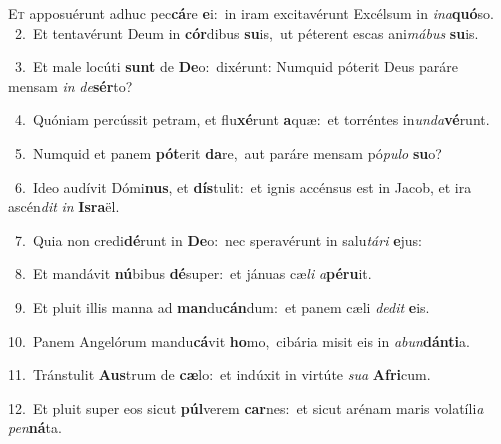 \lettrine{\initial\textcolor{\initialcolor}{E}}{t} apposuérunt adhuc pec\-\textbf{cá}\-re \textbf{e}\-i:~\star in iram excitavérunt Excélsum in \textit{in}\-\textit{a}\textbf{quó}so.\\
{\numbfont\textcolor{\numbcolor}{~2.}}~Et tentavérunt Deum in \textbf{cór}\-dibus \textbf{su}\-is,~\star ut péterent escas ani\-\textit{má}\-\textit{bus} \textbf{su}\-is.\par
{\numbfont\textcolor{\numbcolor}{~3.}}~Et male locúti \textbf{sunt} de \textbf{De}\-o:~\star dixérunt: Numquid póterit Deus paráre mensam \textit{in} \textit{de}\-\textbf{sér}to?\par
{\numbfont\textcolor{\numbcolor}{~4.}}~Quóniam percússit petram, et flu\-\textbf{xé}\-runt \textbf{a}\-quæ:~\star et torréntes in\-\textit{un}\-\textit{da}\textbf{vé}runt.\par
{\numbfont\textcolor{\numbcolor}{~5.}}~Numquid et panem \textbf{pót}\-erit \textbf{da}\-re,~\star aut paráre mensam pó\-\textit{pu}\-\textit{lo} \textbf{su}\-o?\par
{\numbfont\textcolor{\numbcolor}{~6.}}~Ideo audívit Dómi\-\textbf{nus}\-, et \textbf{dís}\-tulit:~\star et ignis accénsus est in Jacob, et ira ascén\textit{dit} \textit{in} \textbf{Is}\-\textbf{ra}ël.\par
{\numbfont\textcolor{\numbcolor}{~7.}}~Quia non credi\-\textbf{dé}\-runt in \textbf{De}\-o:~\star nec speravérunt in salu\-\textit{tá}\-\textit{ri} \textbf{e}\-jus:\par
{\numbfont\textcolor{\numbcolor}{~8.}}~Et mandávit \textbf{nú}\-bibus \textbf{dé}\-super:~\star et jánuas cæ\textit{li} \textit{a}\-\textbf{pé}\textbf{ru}it.\par
{\numbfont\textcolor{\numbcolor}{~9.}}~Et pluit illis manna ad \textbf{man}\-du\-\textbf{cán}\-dum:~\star et panem cæli \textit{de}\-\textit{dit} \textbf{e}\-is.\par
{\numbfont\textcolor{\numbcolor}{10.}}~Panem Angelórum mandu\-\textbf{cá}\-vit \textbf{ho}\-mo,~\star cibária misit eis in \textit{ab}\-\textit{un}\textbf{dán}\textbf{ti}a.\par
{\numbfont\textcolor{\numbcolor}{11.}}~Tránstulit \textbf{Aus}\-trum de \textbf{cæ}\-lo:~\star et indúxit in virtúte \textit{su}\-\textit{a} \textbf{A}\-\textbf{fri}cum.\par
{\numbfont\textcolor{\numbcolor}{12.}}~Et pluit super eos sicut \textbf{púl}\-verem \textbf{car}\-nes:~\star et sicut arénam maris volatíli\textit{a} \textit{pen}\-\textbf{ná}ta.\par
